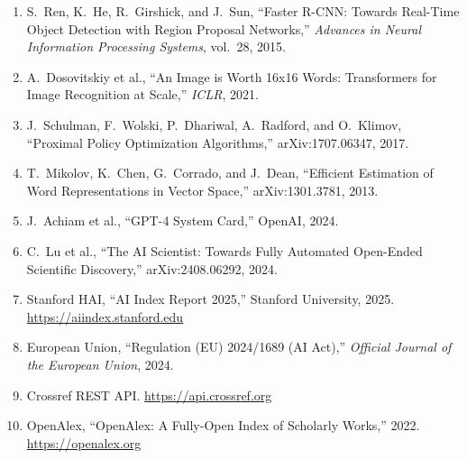\documentclass[11pt]{article}
\begin{document}
\begin{enumerate}
\item S.\ Ren, K.\ He, R.\ Girshick, and J.\ Sun, ``Faster R-CNN: Towards Real-Time Object Detection with Region Proposal Networks,'' \textit{Advances in Neural Information Processing Systems}, vol.\ 28, 2015.

\item A.\ Dosovitskiy et al., ``An Image is Worth 16x16 Words: Transformers for Image Recognition at Scale,'' \textit{ICLR}, 2021.

\item J.\ Schulman, F.\ Wolski, P.\ Dhariwal, A.\ Radford, and O.\ Klimov, ``Proximal Policy Optimization Algorithms,'' arXiv:1707.06347, 2017.

\item T.\ Mikolov, K.\ Chen, G.\ Corrado, and J.\ Dean, ``Efficient Estimation of Word Representations in Vector Space,'' arXiv:1301.3781, 2013.

\item J.\ Achiam et al., ``GPT-4 System Card,'' OpenAI, 2024.

\item C.\ Lu et al., ``The AI Scientist: Towards Fully Automated Open-Ended Scientific Discovery,'' arXiv:2408.06292, 2024.

\item Stanford HAI, ``AI Index Report 2025,'' Stanford University, 2025. \url{https://aiindex.stanford.edu}

\item European Union, ``Regulation (EU) 2024/1689 (AI Act),'' \textit{Official Journal of the European Union}, 2024.

\item Crossref REST API. \url{https://api.crossref.org}

\item OpenAlex, ``OpenAlex: A Fully-Open Index of Scholarly Works,'' 2022. \url{https://openalex.org}
\end{enumerate}
\end{document}
